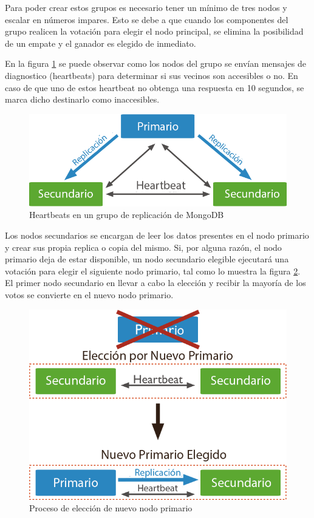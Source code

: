 Para poder crear estos grupos es necesario tener un mínimo de tres nodos y escalar en números impares. Esto se
debe a que cuando los componentes del grupo realicen la votación para elegir el nodo principal, se elimina la posibilidad de un
empate y el ganador es elegido de inmediato.

En la figura \ref{fig:heartbeat} se puede observar como los nodos del grupo se envían mensajes de diagnostico (heartbeats) para determinar si sus vecinos son accesibles o no.
En caso de que uno de estos heartbeat no obtenga una respuesta en 10 segundos, se marca dicho
destinarlo como inaccesibles.

\begin{figure}[H]
	\centering
		\includegraphics[width=.6\textwidth]{figures/heartbeat}
	\caption{Heartbeats en un grupo de replicación de MongoDB}
	\label{fig:heartbeat}
\end{figure}


Los nodos secundarios se encargan de leer los datos presentes en el nodo primario y crear sus propia replica o copia del mismo.
Si, por alguna razón, el nodo primario deja de estar disponible, un nodo secundario elegible ejecutará una votación para elegir el siguiente nodo primario, tal como lo muestra la figura \ref{fig:failover}.
El primer nodo secundario en llevar a cabo la elección y recibir la mayoría de los votos se convierte en el nuevo nodo primario.

\begin{figure}[H]
	\centering
		\includegraphics[width=.6\textwidth]{figures/failover}
	\caption{Proceso de elección de nuevo nodo primario}
	\label{fig:failover}
\end{figure}

